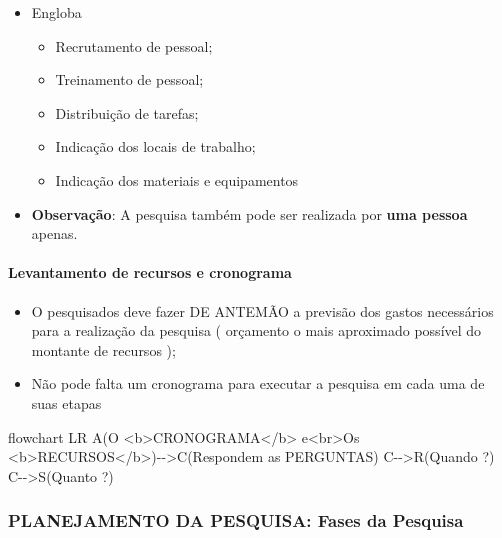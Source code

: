 \documentclass[
]{book}
\newenvironment{Shaded}{\begin{snugshade}}{\end{snugshade}}
\newcommand{\NormalTok}[1]{#1}
\providecommand{\tightlist}{%
  \setlength{\itemsep}{0pt}\setlength{\parskip}{0pt}}
\begin{document}
\begin{itemize}
\tightlist
\item
  Engloba

  \begin{itemize}
  \tightlist
  \item
    Recrutamento de pessoal;
  \item
    Treinamento de pessoal;
  \item
    Distribuição de tarefas;
  \item
    Indicação dos locais de trabalho;
  \item
    Indicação dos materiais e equipamentos
  \end{itemize}
\item
  \textbf{Observação}: A pesquisa também pode ser realizada por
  \textbf{uma pessoa} apenas.
\end{itemize}

\hypertarget{levantamento-de-recursos-e-cronograma}{%
\paragraph{Levantamento de recursos e
cronograma}\label{levantamento-de-recursos-e-cronograma}}

\begin{itemize}
\tightlist
\item
  O pesquisados deve fazer DE ANTEMÃO a previsão dos gastos necessários
  para a realização da pesquisa ( orçamento o mais aproximado possível
  do montante de recursos );
\item
  Não pode falta um cronograma para executar a pesquisa em cada uma de
  suas etapas
\end{itemize}

\begin{Shaded}
\begin{Highlighting}[]
\NormalTok{flowchart LR}
\NormalTok{A(O \textless{}b\textgreater{}CRONOGRAMA\textless{}/b\textgreater{} e\textless{}br\textgreater{}Os \textless{}b\textgreater{}RECURSOS\textless{}/b\textgreater{}){-}{-}\textgreater{}C(Respondem as PERGUNTAS)}
\NormalTok{C{-}{-}\textgreater{}R(Quando ?)}
\NormalTok{C{-}{-}\textgreater{}S(Quanto ?)}
\end{Highlighting}
\end{Shaded}

\hypertarget{planejamento-da-pesquisa-fases-da-pesquisa}{%
\subsubsection{PLANEJAMENTO DA PESQUISA: Fases da
Pesquisa}\label{planejamento-da-pesquisa-fases-da-pesquisa}}
\end{document}
